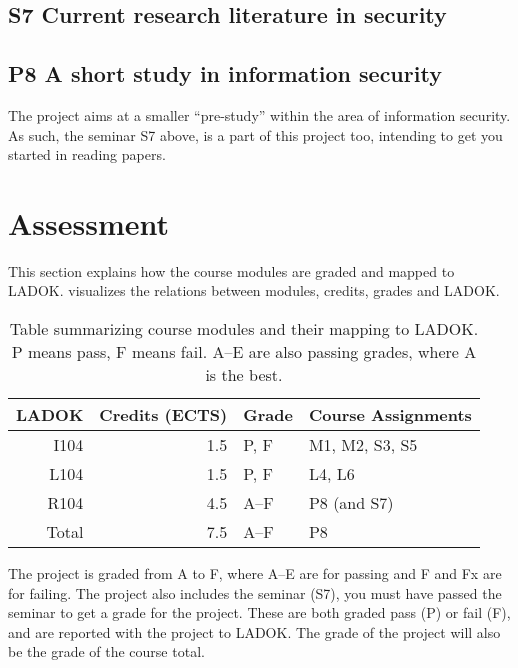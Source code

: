\subsection{S7 Current research literature in security}


\subsection{P8 A short study in information security}

The project aims at a smaller \enquote{pre-study} within the area of 
information security.
As such, the seminar S7 above, is a part of this project too, intending to get 
you started in reading papers.


\section{Assessment}%
\label{Assessment}

This section explains how the course modules are graded and mapped to LADOK\@.
 visualizes the relations between modules, credits, grades and 
LADOK\@.

\begin{table}
  \centering
  \setlength{\tabcolsep}{0.5em}
  \begin{tabular}{r r l l}
    \toprule
    LADOK & Credits (ECTS)  & Grade       & Course Assignments\\
    \midrule
    I104  & 1.5             & P, F        & M1, M2, S3, S5\\
    L104  & 1.5             & P, F        & L4, L6\\
    R104  & 4.5             & A--F        & P8 (and S7)\\
    \midrule
    Total & 7.5             & A--F        & P8\\
    \bottomrule
  \end{tabular}
  \caption{%
    Table summarizing course modules and their mapping to LADOK\@.
    P means pass, F means fail.
    A--E are also passing grades, where A is the best.
  }\label{LADOKTable}
\end{table}

The project is graded from A to F, where A--E are for passing and F and Fx are 
for failing.
The project also includes the seminar (S7), \ie you must have passed the seminar 
to get a grade for the project.
These are both graded pass (P) or fail (F), and are reported with the project 
to LADOK\@.
The grade of the project will also be the grade of the course total.

